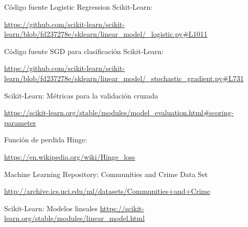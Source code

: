 \documentclass[12pt, spanish]{article}
\begin{document}
\begin{thebibliography}{9}
Código fuente Logistic Regression Scikit-Learn:

\url{https://github.com/scikit-learn/scikit-learn/blob/fd237278e/sklearn/linear_model/_logistic.py#L1011}



Código fuente SGD para clasificación Scikit-Learn:

\url{https://github.com/scikit-learn/scikit-learn/blob/fd237278e/sklearn/linear_model/_stochastic_gradient.py#L731}



Scikit-Learn: Métricas para la validación cruzada

\url{https://scikit-learn.org/stable/modules/model_evaluation.html#scoring-parameter}


Función de perdida Hinge:

\url{https://en.wikipedia.org/wiki/Hinge_loss}


Machine Learning Repository: Communities and Crime Data Set  

\url{http://archive.ics.uci.edu/ml/datasets/Communities+and+Crime}

Scikit-Learn: Modelos lineales
\url{https://scikit-learn.org/stable/modules/linear_model.html}




\end{thebibliography}
\end{document}
